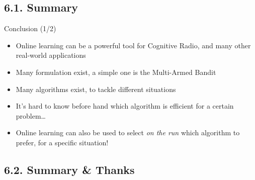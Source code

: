 \documentclass[12pt,english,ignorenonframetext,]{beamer}
\providecommand{\tightlist}{%
  \setlength{\itemsep}{0pt}\setlength{\parskip}{0pt}}
\begin{document}
\subsection{\hfill{}6.1. Summary\hfill{}}

\begin{frame}{%
\protect\hypertarget{conclusion-12}{%
Conclusion (1/2)}}

\begin{itemize}
\tightlist
\item
  Online learning can be a powerful tool for Cognitive Radio, and many
  other real-world applications
\item
  Many formulation exist, a simple one is the Multi-Armed Bandit
\item
  Many algorithms exist, to tackle different situations
\item
  It’s hard to know before hand which algorithm is efficient for a
  certain problem\ldots{}
\item
  Online learning can also be used to select \emph{on the run} which
  algorithm to prefer, for a specific situation!
\end{itemize}

\end{frame}



\subsection{\hfill{}6.2. Summary \& Thanks\hfill{}}
\end{document}
